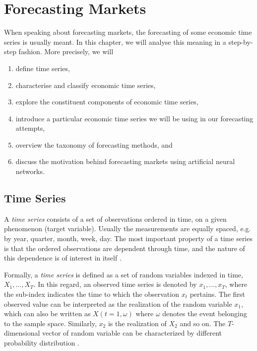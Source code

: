 \chapter{Forecasting Markets}

When speaking about forecasting markets, the forecasting of some economic time series is usually meant. In this chapter, we will analyse this meaning in a step-by-step fashion. More precisely, we will

\begin{enumerate}
\item define time series,
\item characterise and classify economic time series,
\item explore the constituent components of economic time series,
\item introduce a particular economic time series we will be using in our forecasting attempts,
\item overview the taxonomy of forecasting methods, and
\item discuss the motivation behind forecasting markets using artificial neural networks.
\end{enumerate}

\section{Time Series}

A \textit{time series} consists of a set of observations ordered in time, on a given phenomenon (target variable). Usually the measurements are equally spaced, e.g. by year, quarter, month, week, day. The most important property of a time series is that the ordered observations are dependent through time, and the nature of this dependence is of interest in itself \cite{Dagum06}.

Formally, a \textit{time series} is defined as a set of random variables indexed in time, $X_1, ..., X_T$. In this regard, an observed time series is denoted by $ x_1, ..., x_T $, where the sub-index indicates the time to which the observation $x_t$ pertains. The first observed value can be interpreted as the realization of the random variable $x_1$, which can also be written as $X(t = 1, \omega)$ where $\omega$ denotes the event belonging to the sample space. Similarly, $x_2$ is the realization of $X_2$ and so on. The $T$-dimensional vector of random variable can be characterized by different probability distribution \cite{Dagum06}.

